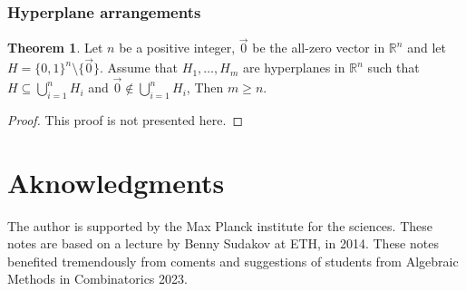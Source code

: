 \documentclass[12pt]{amsart}
\theoremstyle{definition}
\newtheorem{thm}{Theorem}[section]
\newcommand{\R}{\mathbb{R}}
\begin{document}
\subsubsection{Hyperplane arrangements}

\begin{thm}
Let $n$ be a positive integer, $\vec{0}$ be the all-zero vector in $\R^n$ and let $H = \{0, 1\}^n\setminus \{\vec{0}\}$.
Assume that $H_1, \ldots, H_m$ are hyperplanes in $\R^n$ such that $H \subseteq \bigcup_{i=1}^n H_i$ and $\vec{0}\not\in \bigcup_{i=1}^n H_i$, 
Then $m \geq n$.
\end{thm}

\begin{proof}
This proof is not presented here.
\end{proof}


\section*{Aknowledgments}
The author is supported by the Max Planck institute for the sciences. 
These notes are based on a lecture by Benny Sudakov at ETH, in 2014.
These notes benefited tremendously from coments and suggestions of students from Algebraic Methods in Combinatorics 2023.




\end{document}
